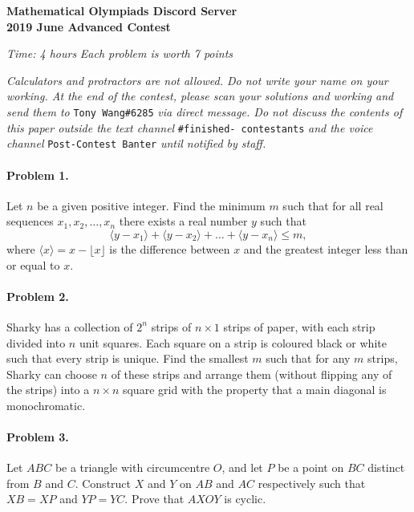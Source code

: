 \documentclass[11pt]{article}
\begin{document}
		\noindent \Large\textbf{Mathematical Olympiads Discord Server}
		\vspace{5pt}\\
		\noindent \huge\textbf{2019 June Advanced Contest}\\
		\noindent \makebox[\linewidth]{\rule{\textwidth}{0.4pt}}
			
	\normalsize
	
	\begin{flushright}
	\textit{Time: 4 hours} \hfill \textit{Each problem is worth 7 points}
	\end{flushright}
	
	\noindent \textit{Calculators and protractors are not allowed. Do not write your name on your working. At the end of the contest, please scan your solutions and working and send them to }\texttt{Tony Wang\#6285}\textit{ via direct message. Do not discuss the contents of this paper outside the text channel }\texttt{\#finished- contestants}\textit{ and the voice channel }\texttt{Post-Contest Banter}\textit{ until notified by staff.}
	
	\paragraph{Problem 1.} Let \(n\) be a given positive integer. Find the minimum \(m\) such that for all real sequences \(x_1, x_2, \dots, x_n\) there exists a real number \(y\) such that \[\langle y - x_1 \rangle + \langle y - x_2 \rangle + \dots + \langle y - x_n \rangle \leq m,\] where \(\langle x \rangle = x - \lfloor x \rfloor\) is the difference between \(x\) and the greatest integer less than or equal to \(x\).

	\paragraph{Problem 2.} Sharky has a collection of \(2^n\) strips of \(n \times 1\) strips of paper, with each strip divided into \(n\) unit squares. Each square on a strip is coloured black or white such that every strip is unique. Find the smallest \(m\) such that for any \(m\) strips, Sharky can choose \(n\) of these strips and arrange them (without flipping any of the strips) into a \(n \times n\) square grid with the property that a main diagonal is monochromatic.

	\paragraph{Problem 3.} Let \(ABC\) be a triangle with circumcentre \(O\), and let \(P\) be a point on \(BC\) distinct from \(B\) and \(C\). Construct \(X\) and \(Y\) on \(AB\) and \(AC\) respectively such that \(XB = XP\) and \(YP = YC\). Prove that \(AXOY\) is cyclic.
\end{document}
